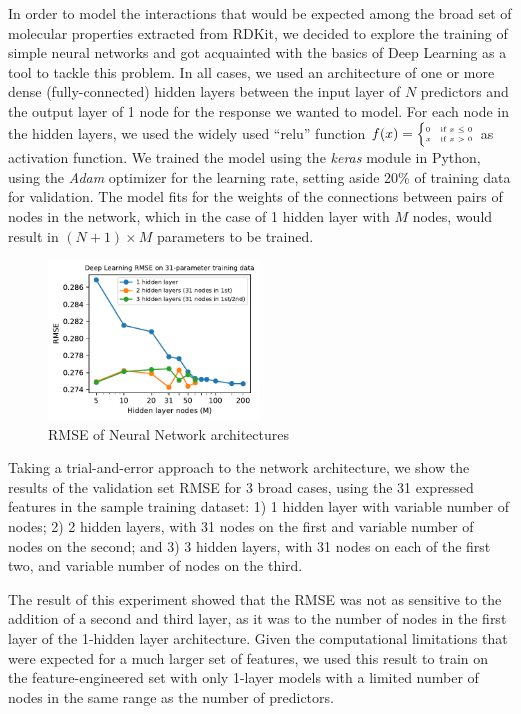 \documentclass[11pt]{article}
\begin{document}
In order to model the interactions that would be expected among the broad set of molecular properties extracted from RDKit, we decided to explore the training of simple neural networks and got acquainted with the basics of Deep Learning as a tool to tackle this problem. In all cases, we used an architecture of one or more dense (fully-connected) hidden layers between the input layer of $N$ predictors and the output layer of 1 node for the response we wanted to model. For each node in the hidden layers, we used the widely used ``relu'' function $ f(x) = {\tiny \begin{cases} 0 & \text{if } x \le 0 \\ x & \text{if } x>0 \end{cases}}$ as activation function. We trained the model using the \emph{keras} module in Python, using the \emph{Adam} optimizer for the learning rate, setting aside 20\% of training data for validation. The model fits for the weights of the connections between pairs of nodes in the network, which in the case of 1 hidden layer with $M$ nodes, would result in $(N + 1) \times M$ parameters to be trained.

\begin{figure}
\centering
\includegraphics[width=0.5\textwidth]{DL_mse_AC.pdf}
\caption{RMSE of Neural Network architectures}
\label{fig:DL_mse}
\end{figure}

Taking a trial-and-error approach to the network architecture, we show the results of the validation set RMSE for 3 broad cases, using the 31 expressed features in the sample training dataset: 1) 1 hidden layer with variable number of nodes; 2) 2 hidden layers, with 31 nodes on the first and variable number of nodes on the second; and 3) 3 hidden layers, with 31 nodes on each of the first two, and variable number of nodes on the third.

The result of this experiment showed that the RMSE was not as sensitive to the addition of a second and third layer, as it was to the number of nodes in the first layer of the 1-hidden layer architecture. Given the computational limitations that were expected for a much larger set of features, we used this result to train on the feature-engineered set with only 1-layer models with a limited number of nodes in the same range as the number of predictors.
\end{document}
